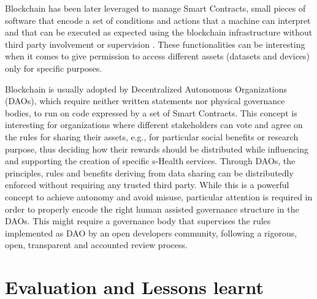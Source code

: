 \documentclass[conference]{IEEEtran}
\begin{document}
Blockchain has been later leveraged to manage Smart Contracts, small pieces of software that encode a set of conditions and actions that a machine can interpret and that can be executed as expected using the blockchain infrastructure without third party involvement or supervision \cite{Buterin2014}. These functionalities can be interesting when it comes to give permission to access different assets (datasets and devices) only for specific purposes.

Blockchain is usually adopted by Decentralized Autonomous Organizations (DAOs), which require neither written statements nor physical governance bodies, to run on code expressed by a set of Smart Contracts. This concept is interesting for organizations where different stakeholders can vote and agree on the rules for sharing their assets, e.g., for particular social benefits or research purpose, thus deciding how their rewards should be distributed while influencing and supporting the creation of specific s-Health services. Through DAOs, the principles, rules and benefits deriving from data sharing can be distributedly enforced without requiring any trusted third party. While this is a powerful concept to achieve autonomy and avoid misuse, particular attention is required in order to properly encode the right human assisted governance structure in the DAOs. This might require a governance body that supervises the rules implemented as DAO by an open developers community, following a rigorous, open, transparent and accounted review process.





\section{Evaluation and Lessons learnt}

\end{document}
